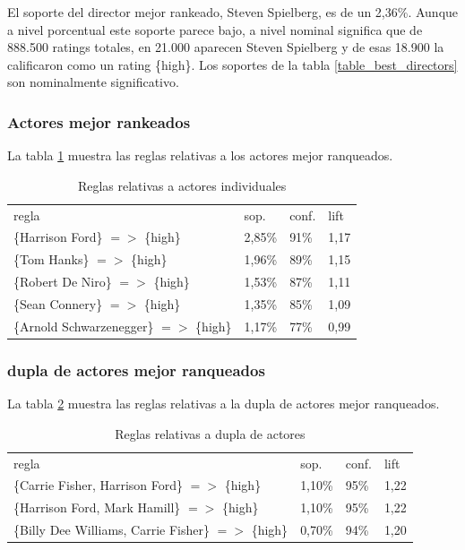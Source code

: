 \documentclass[journal]{IEEEtran}
\begin{document}
El soporte del director mejor rankeado, Steven Spielberg, es de un 2,36\%. Aunque a nivel
porcentual este soporte parece bajo, a nivel nominal significa que de 888.500 ratings
totales, en 21.000 aparecen Steven Spielberg y de esas 18.900 la calificaron como un
rating \{high\}. Los soportes de la tabla \ref{table_best_directors} 
son nominalmente significativo. 

\subsubsection{Actores mejor rankeados}
La tabla \ref{table_best_cast}   muestra las reglas relativas a los actores 
mejor ranqueados.
\begin{table}[ht!]
\caption{Reglas relativas a actores individuales}
\label{table_best_cast}
\centering
\begin{tabular}{l l l l }
regla & sop. & conf. & lift \\
\{Harrison Ford\} $=$$>$ \{high\} & 2,85\% & 91\% & 1,17 \\
\{Tom Hanks\} $=$$>$ \{high\} & 1,96\% & 89\% & 1,15 \\
\{Robert De Niro\} $=$$>$ \{high\} & 1,53\% & 87\% & 1,11 \\
\{Sean Connery\} $=$$>$ \{high\} & 1,35\% & 85\% & 1,09 \\
\{Arnold Schwarzenegger\} $=$$>$ \{high\} & 1,17\% & 77\% & 0,99
\end{tabular}
\end{table}


\subsubsection{dupla de actores mejor ranqueados}
La tabla \ref{table_best_tuple}   muestra las reglas relativas a la 
dupla de  actores mejor ranqueados.
\begin{table}[ht!]
\caption{Reglas relativas a dupla de actores}
\label{table_best_tuple}
\centering
\begin{tabular}{l l l l }
regla & sop. & conf. & lift \\
\{Carrie Fisher, Harrison Ford\} $=$$>$ \{high\} & 1,10\% & 95\% & 1,22 \\
\{Harrison Ford, Mark Hamill\} $=$$>$ \{high\} & 1,10\% & 95\% & 1,22 \\
\{Billy Dee Williams, Carrie Fisher\} $=$$>$ \{high\} & 0,70\% & 94\% & 1,20 \\
\end{tabular}
\end{table}
\end{document}
